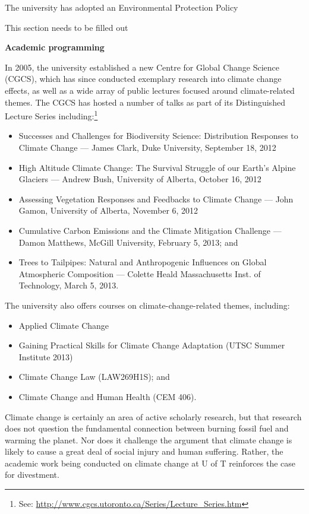 The university has adopted an Environmental Protection Policy

\begin{vcom}
	This section needs to be filled out
\end{vcom}




\textbf{Academic programming}



In 2005, the university established a new Centre for Global Change Science (CGCS), which has since conducted exemplary research into climate change effects, as well as a wide array of public lectures focused around climate-related themes. The CGCS has hosted a number of talks as part of its Distinguished Lecture Series including:\footnote{See: \url{http://www.cgcs.utoronto.ca/Series/Lecture_Series.htm}}
\begin{itemize}
	\item Successes and Challenges for Biodiversity Science: Distribution Responses to Climate Change --- James Clark, Duke University, September 18, 2012
	\item High Altitude Climate Change: The Survival Struggle of our Earth’s Alpine Glaciers --- Andrew Bush, University of Alberta, October 16, 2012 
	\item Assessing Vegetation Responses and Feedbacks to Climate Change --- John Gamon, University of Alberta, November 6, 2012
	\item Cumulative Carbon Emissions and the Climate Mitigation Challenge --- Damon Matthews, McGill University, February 5, 2013; and
	\item Trees to Tailpipes: Natural and Anthropogenic Influences on Global Atmospheric Composition --- Colette Heald Massachusetts Inst. of Technology, March 5, 2013.
\end{itemize}



The university also offers courses on climate-change-related themes, including:
\begin{itemize}
	\item Applied Climate Change
	\item Gaining Practical Skills for Climate Change Adaptation (UTSC Summer Institute 2013)
	\item Climate Change Law (LAW269H1S); and
	\item Climate Change and Human Health (CEM 406).
\end{itemize}



Climate change is certainly an area of active scholarly research, but that research does not question the fundamental connection between burning fossil fuel and warming the planet. 
Nor does it challenge the argument that climate change is likely to cause a great deal of social injury and human suffering.
Rather, the academic work being conducted on climate change at U of T reinforces the case for divestment.

